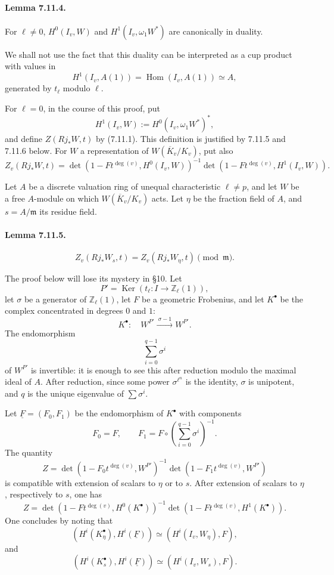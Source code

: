 \documentclass[10pt]{article}
\newcommand{\Hom}{\operatorname{Hom}}
\providecommand{\Ker}{\operatorname{Ker}}
\providecommand{\Hom}{\operatorname{Hom}}
\providecommand{\Hom}{\operatorname{Hom}}
\providecommand{\Hom}{\operatorname{Hom}}
\providecommand{\Ker}{\operatorname{Ker}}
\begin{document}
\paragraph{Lemma 7.11.4.} For \(\ell\ne0\), \(H^0(I_v,W)\) and \(H^1(I_v,\omega_1W^*)\) are canonically in duality.

We shall not use the fact that this duality can be interpreted as a cup product with values in
\[
H^1(I_v,A(1))=\Hom(I_v,A(1))\simeq A,
\]
generated by \(t_\ell\) modulo \(\ell\).

For \(\ell=0\), in the course of this proof, put
\[
H^1(I_v,W):=H^0(I_v,\omega_1W^*)^*,
\]
and define \(Z(Rj_*W,t)\) by (7.11.1). This definition is justified by 7.11.5 and 7.11.6 below. For \(W\) a representation of \(W(\overline K_v/K_v)\), put also
\[
Z_v(Rj_*W,t)=
\det(1-Ft^{\deg(v)},H^0(I_v,W))^{-1}
\det(1-Ft^{\deg(v)},H^1(I_v,W)).
\]

Let \(A\) be a discrete valuation ring of unequal characteristic \(\ell\ne p\), and let \(W\) be a free \(A\)-module on which \(W(\overline K_v/K_v)\) acts. Let \(\eta\) be the fraction field of \(A\), and \(s=A/\mathfrak m\) its residue field.

\paragraph{Lemma 7.11.5.}
\[
Z_v(Rj_*W_s,t)=Z_v(Rj_*W_\eta,t)\pmod{\mathfrak m}.
\]

The proof below will lose its mystery in §10. Let
\[
P'=\Ker(t_\ell:I\to\mathbb Z_\ell(1)),
\]
let \(\sigma\) be a generator of \(\mathbb Z_\ell(1)\), let \(F\) be a geometric Frobenius, and let \(K^\bullet\) be the complex concentrated in degrees \(0\) and \(1\):
\[
K^\bullet:\quad W^{P'}\xrightarrow{\ \sigma-1\ } W^{P'}.
\]
The endomorphism
\[
\sum_{i=0}^{q-1}\sigma^i
\]
of \(W^{P'}\) is invertible: it is enough to see this after reduction modulo the maximal ideal of \(A\). After reduction, since some power \(\sigma^{\ell^n}\) is the identity, \(\sigma\) is unipotent, and \(q\) is the unique eigenvalue of \(\sum\sigma^i\).

Let \(\underline F=(F_0,F_1)\) be the endomorphism of \(K^\bullet\) with components
\[
F_0=F,\qquad
F_1=F\circ\left(\sum_{i=0}^{q-1}\sigma^i\right)^{-1}.
\]
The quantity
\[
Z=\det(1-F_0t^{\deg(v)},W^{P'})^{-1}
\det(1-F_1t^{\deg(v)},W^{P'})
\]
is compatible with extension of scalars to \(\eta\) or to \(s\). After extension of scalars to \(\eta\), respectively to \(s\), one has
\[
Z=\det(1-Ft^{\deg(v)},H^0(K^\bullet))^{-1}
\det(1-Ft^{\deg(v)},H^1(K^\bullet)).
\]
One concludes by noting that
\[
(H^i(K_\eta^\bullet),H^i(\underline F))\simeq(H^i(I_v,W_\eta),F),
\]
and
\[
(H^i(K_s^\bullet),H^i(\underline F))\simeq(H^i(I_v,W_s),F).
\]
\end{document}
